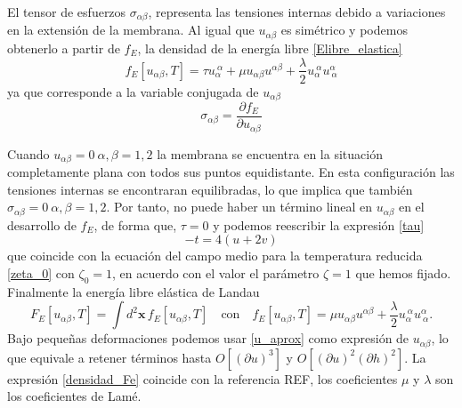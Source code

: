 El tensor de esfuerzos $\sigma_{\alpha\beta}$, representa las tensiones
internas debido a variaciones en la extensión de la membrana. Al igual que
$u_{\alpha\beta}$ es simétrico y podemos obtenerlo a partir de $f_E$, la densidad de
la energía libre \eqref{Elibre_elastica}
\begin{equation}
f_E[u_{\alpha\beta},T]=\tau u_{\alpha}^{\ \alpha}+
\mu u_{\alpha\beta}u^{\alpha\beta} +
\frac{\lambda}{2}u_{\alpha}^{\ \alpha}u^{\alpha}_{\ \alpha}
\end{equation}
ya que corresponde a la variable conjugada de $u_{\alpha\beta}$
\begin{equation}\label{tensor_esfuerzos}
\sigma_{\alpha\beta}=\frac{\partial f_E}{ \partial u_{\alpha\beta}}
\end{equation}

Cuando $u_{\alpha\beta}=0 \ \alpha,\beta=1,2$ la membrana se encuentra en
la situación completamente plana con todos sus puntos equidistante. En esta
configuración las tensiones internas se encontraran equilibradas, lo que
implica que también $\sigma_{\alpha\beta}=0 \ \alpha,\beta=1,2$. Por tanto, no puede haber
un término lineal en $u_{\alpha\beta}$ en el desarrollo de $f_E$, de forma que,
 $\tau=0$ y podemos reescribir la expresión \eqref{tau}
\begin{equation}\label{tau=0}
-t=4(u+2v)
\end{equation}   
que coincide con la ecuación del campo medio para la temperatura reducida
\eqref{zeta_0} con $\zeta_0=1$, en acuerdo con el valor el parámetro $\zeta=1$
que hemos fijado. Finalmente la energía libre elástica de Landau 
\begin{equation}
F_E[u_{\alpha\beta},T]=\int d^2\mathbf{x}\, f_E[u_{\alpha\beta},T]\quad \text{con}\quad
f_E[u_{\alpha\beta},T]=
\mu u_{\alpha\beta}u^{\alpha\beta} +
\frac{\lambda}{2}u_{\alpha}^{\ \alpha}u^{\alpha}_{\ \alpha}\label{densidad_Fe}.
\end{equation} 
Bajo pequeñas deformaciones podemos usar \eqref{u_aprox} 
como expresión de $u_{\alpha\beta}$, lo que equivale a retener términos hasta
$O[(\partial u)^3]$ y $O[(\partial u)^2(\partial h)^2]$. La expresión
\eqref{densidad_Fe} coincide con la referencia REF, los coeficientes $\mu$ y
$\lambda$ son los coeficientes de Lamé.  

